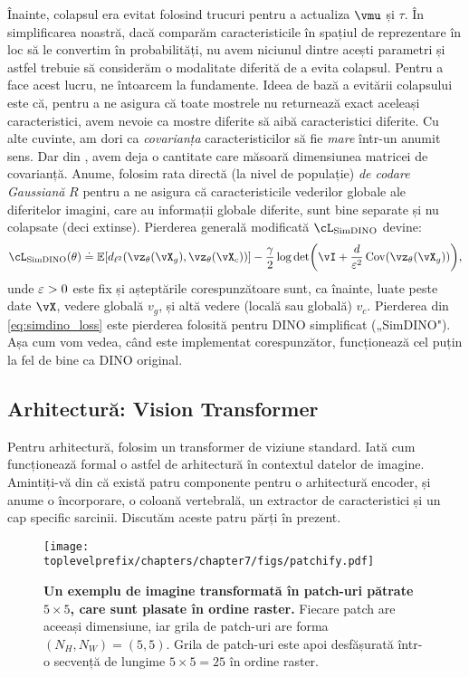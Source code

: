 \documentclass[../../book-main_ro.tex]{subfiles}
\begin{document}
Înainte, colapsul era evitat folosind trucuri pentru a actualiza \(\vmu\) și \(\tau\). În simplificarea noastră, dacă comparăm caracteristicile în spațiul de reprezentare în loc să le convertim în probabilități, nu avem niciunul dintre acești parametri și astfel trebuie să considerăm o modalitate diferită de a evita colapsul. Pentru a face acest lucru, ne întoarcem la fundamente. Ideea de bază a evitării colapsului este că, pentru a ne asigura că toate mostrele nu returnează exact aceleași caracteristici, avem nevoie ca mostre diferite să aibă caracteristici diferite. Cu alte cuvinte, am dori ca \textit{covarianța} caracteristicilor să fie \textit{mare} într-un anumit sens. Dar din , avem deja o cantitate care măsoară dimensiunea matricei de covarianță. Anume, folosim rata directă (la nivel de populație) \textit{de codare Gaussiană} \(R\) pentru a ne asigura că caracteristicile vederilor globale ale diferitelor imagini, care au informații globale diferite, sunt bine separate și nu colapsate (deci extinse). Pierderea generală modificată \(\cL_{\simdino}\) devine:
\begin{equation}\label{eq:simdino_loss}
    \cL_{\simdino}(\theta) \doteq \Ex[d_{\ell^{2}}(\vz_{\theta}(\vX_{g}),
    \vz_{\theta}(\vX_{c}))] - \frac{\gamma}{2}\log\det\rp{\vI + \frac{d}{\eps^{2}}\Cov(\vz_{\theta}(\vX_{g}))},
\end{equation}
unde \(\varepsilon > 0\) este fix și așteptările corespunzătoare sunt, ca înainte, luate peste date \(\vX\), vedere globală \(v_{g}\), și altă vedere (locală sau globală) \(v_{c}\). Pierderea din \eqref{eq:simdino_loss} este pierderea folosită pentru DINO simplificat („SimDINO"). Așa cum vom vedea, când este implementat corespunzător, funcționează cel puțin la fel de bine ca DINO original.

\subsection{Arhitectură: Vision Transformer}\label{sub:contrastive_learning_architecture}

Pentru arhitectură, folosim un transformer de viziune standard. Iată cum funcționează formal o astfel de arhitectură în contextul datelor de imagine. Amintiți-vă din  că există patru componente pentru o arhitectură encoder, și anume o încorporare, o coloană vertebrală, un extractor de caracteristici și un cap specific sarcinii. Discutăm aceste patru părți în prezent.

\begin{figure}
    \centering 
    \texttt{[image: \\toplevelprefix/chapters/chapter7/figs/patchify.pdf]}
    \caption{\small\textbf{Un exemplu de imagine transformată în patch-uri pătrate \(5 \times 5\), care sunt plasate în ordine raster.} Fiecare patch are aceeași dimensiune, iar grila de patch-uri are forma \((N_{H}, N_{W}) = (5, 5)\). Grila de patch-uri este apoi desfășurată într-o secvență de lungime \(5 \times 5 = 25\) în ordine raster.}
    \label{fig:patchify_rasterize}
\end{figure}
\end{document}
